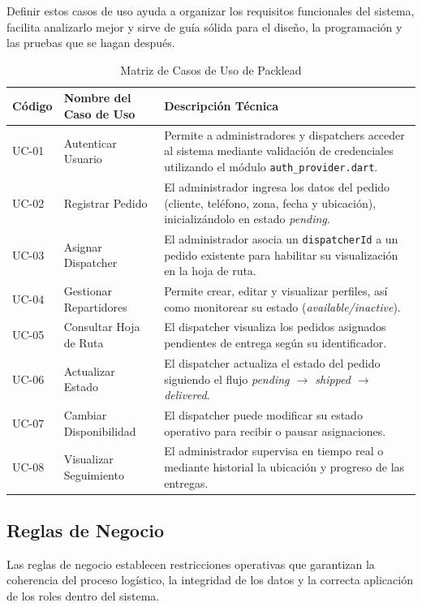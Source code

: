 Definir estos casos de uso ayuda a organizar los requisitos funcionales del sistema, facilita analizarlo mejor y sirve de guía sólida para el diseño, la programación y las pruebas que se hagan después.

\begin{table}[H]
\centering
\caption{Matriz de Casos de Uso de Packlead}
\vspace{3mm}
\begin{tabularx}{\textwidth}{l l L}
\toprule
\textbf{Código} & \textbf{Nombre del Caso de Uso} & \textbf{Descripción Técnica} \\
\midrule
UC-01 & Autenticar Usuario & Permite a administradores y dispatchers acceder al sistema mediante validación de credenciales utilizando el módulo \texttt{auth\_provider.dart}. \\
\addlinespace
UC-02 & Registrar Pedido & El administrador ingresa los datos del pedido (cliente, teléfono, zona, fecha y ubicación), inicializándolo en estado \textit{pending}. \\
\addlinespace
UC-03 & Asignar Dispatcher & El administrador asocia un \texttt{dispatcherId} a un pedido existente para habilitar su visualización en la hoja de ruta. \\
\addlinespace
UC-04 & Gestionar Repartidores & Permite crear, editar y visualizar perfiles, así como monitorear su estado (\textit{available/inactive}). \\
\addlinespace
UC-05 & Consultar Hoja de Ruta & El dispatcher visualiza los pedidos asignados pendientes de entrega según su identificador. \\
\addlinespace
UC-06 & Actualizar Estado & El dispatcher actualiza el estado del pedido siguiendo el flujo \textit{pending $\rightarrow$ shipped $\rightarrow$ delivered}. \\
\addlinespace
UC-07 & Cambiar Disponibilidad & El dispatcher puede modificar su estado operativo para recibir o pausar asignaciones. \\
\addlinespace
UC-08 & Visualizar Seguimiento & El administrador supervisa en tiempo real o mediante historial la ubicación y progreso de las entregas. \\
\bottomrule
\end{tabularx}
\end{table}

\subsection{Reglas de Negocio}
Las reglas de negocio establecen restricciones operativas que garantizan la coherencia del proceso logístico, la integridad de los datos y la correcta aplicación de los roles dentro del sistema.

